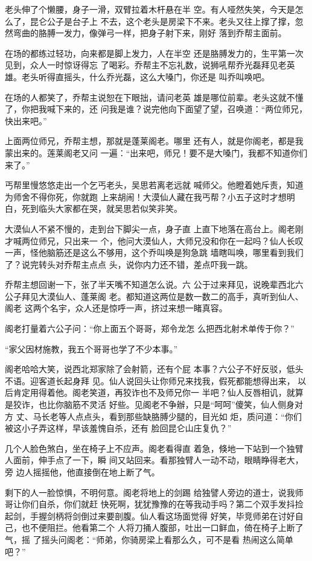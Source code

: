 老头伸了个懒腰，身子一滑，双臂拉着木杆悬在半
空。有人哑然失笑，今天是怎么了，昆仑公子是台子上
不去，这个老头是房梁下不来。老头又往上撑了撑，忽
然弯曲的胳膊一发力，像弹弓一样，把身子射下来，刚好
落到乔帮主面前。

在场的都练过轻功，向来都是脚上发力，人在半空
还是胳膊发力的，生平第一次见到，众人一时惊讶得忘
了喝彩。乔帮主不忘礼数，说狮吼帮乔光磊拜见老英
雄。老头听得直摇头，什么乔光磊，这么大嗓门，你还是
叫乔叫唤吧。

在场的人都笑了，乔帮主说恕在下眼拙，请问老英
雄是哪位前辈。老头这就不懂了，你把我喊下来的，还
问我是谁？说完他向下面望了望，召唤道：“两位师兄，
快出来吧。”

上面两位师兄，乔帮主想，那就是蓬莱阁老。哪里
还有人，就是你阁老，都是我蒙出来的。莲莱阁老又问
一遍：“出来吧，师兄！要不是大嗓门，我都不知道你们
来了。”

丐帮里慢悠悠走出一个乞丐老头，吴思若离老远就
喊师父。他瞪着她斥责，知道为师舍不得你死，你就跑
上来胡闹！大漠仙人藏在我丐帮？小五子这时才想明
白，死到临头大家都在哭，就吴思若似笑非笑。

大漠仙人不紧不慢的，走到台下脚尖一点，身子直
上直下地落在高台上。阁老刚才喊两位师兄，只出来一
个，他问大漠仙人，大师兄没和你在一起吗？仙人长叹
一声，怪他脑筋还是这么不够用，这个乔叫唤是狗急跳
墙瞎叫唤，哪里看到我们了？说完转头对乔帮主点点
头，说你内力还不错，差点吓我一跳。

乔帮主想回谢一下，张了半天嘴不知道怎么说。六
公于过来拜见，说晚辈西北六公子拜见大漠仙人、蓬莱阁
老。都知道这两位是数一数二的高手，真听到仙人、阁老
这两个名宇，众人还是惊呼一声，挤过来想一睹真容。

阁老打量着六公子问：“你上面五个哥哥，郑令龙怎
么把西北射术单传于你？”

“家父因材施教，我五个哥哥也学了不少本事。”

阁老哈哈大笑，说西北郑家除了会射箭，还有个屁
本事？六公子不好反驳，低头不语。迎客道长起身拜
见。仙人说回头让你师兄来找我，假死都能想得出来，
以后肯定用得着他。阁老笑道，再狡诈也不及师兄你一
半吧？仙人反唇相讥，就算是狡诈，也比你脑筋不灵活
好些。见阁老不争辦，只是“呵呵”傻笑，仙人侧身对方
丈、马长老等人点点头，看到那些缺胳膊少腿的，目光如
炬，质问道：“你们被这小子弄这样，早该羞愧自杀，还有
脸回昆仑山庄复仇？”

几个人脸色煞白，坐在椅子上不应声。阁老看得直
着急，倏地一下站到一个独臂人面前，伸手点了一下，瞬
间又站回来。看那独臂人一动不动，眼睛睁得老大，旁
边人摇摇他，他直接倒在地上断了气。

剩下的人一脸惊惧，不明何意。阁老将地上的剑踢
给独譬人旁边的道士，说我师哥让你们自杀，你们就赶
快死啊，犹犹豫豫的在等我动手吗？第二个双手发抖捡
起剑，手握剑柄将剑倒过来要剖腹。仙人看这场面觉得
好笑，毕竞师弟在讨好自己，也不便阻拦。他看第二个
人将刀捅人腹部，吐出一口鲜血，倚在椅子上断了气，摇
了摇头问阁老：“师弟，你骑房梁上看那么久，可不是看
热闹这么简单吧？”

